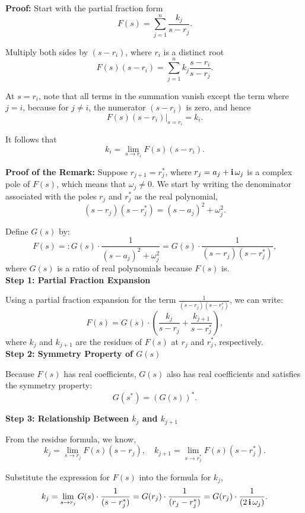 \textbf{Proof:}  Start with the partial fraction form
    \[
    F(s) = \sum_{j=1}^n \frac{k_j}{s - r_j}.
    \]

Multiply both sides by \((s - r_i)\), where \(r_i\) is a distinct root
    \[
    F(s) (s - r_i) = \sum_{j=1}^n k_j \frac{s - r_i}{s - r_j}.
    \]

 At \(s = r_i\), note that all terms in the summation vanish except the term where \(j = i\), because for \(j \neq i\), the numerator \((s - r_i)\) is zero, and hence
    \[
    F(s) (s - r_i) \Big|_{s = r_i} = k_i.
    \]

It follows that
    \[
    k_i = \lim_{s \to r_i} F(s) (s - r_i).
    \]
\Qed

\textbf{Proof of the Remark:} Suppose \(r_{j+1} = r_j^\ast\), where \(r_j = a_j + \mathop{\bm{\mathrm i}} \omega_j\) is a complex pole of \(F(s)\), which means that $\omega_j \neq 0$. We start by writing the denominator associated with the poles \(r_j\) and \(r_j^\ast\) as the real polynomial,
\[
(s - r_j)(s - r_j^\ast) = \left(s - a_j \right)^2 + \omega_j^2.
\]

Define \(G(s)\) by:
\[
F(s) =: G(s) \cdot \frac{1}{\left(s - a_j \right)^2 + \omega_j^2} = G(s) \cdot \frac{1}{(s - r_j)(s - r_j^\ast)},
\]
where \(G(s)\) is a ratio of real polynomials because \(F(s)\) is.\\

\textbf{Step 1: Partial Fraction Expansion}

Using a partial fraction expansion for the term \(\frac{1}{(s - r_j)(s - r_j^\ast)}\), we can write:
\[
F(s) = G(s) \cdot \left(\frac{k_j}{s - r_j} + \frac{k_{j+1}}{s - r_j^\ast}\right),
\]
where \(k_j\) and \(k_{j+1}\) are the residues of \(F(s)\) at \(r_j\) and \(r_j^\ast\), respectively.\\

\textbf{Step 2: Symmetry Property of \(G(s)\)}

Because \(F(s)\) has real coefficients, \(G(s)\) also has real coefficients and satisfies the symmetry property:
\[
G(s^\ast) = \left(G(s)\right)^\ast.
\]

\textbf{Step 3: Relationship Between \(k_j\) and \(k_{j+1}\)}

From the residue formula, we know,
\[
k_j = \lim_{s \to r_j} F(s)(s - r_j), \quad k_{j+1} = \lim_{s \to r_j^\ast} F(s)(s - r_j^\ast).
\]

Substitute the expression for \(F(s)\) into the formula for \(k_j\),
\[
k_j = \lim_{s \to r_j} G(s) \cdot \frac{1}{(s - r_j^\ast)} = G(r_j) \cdot \frac{1}{(r_j - r_j^\ast)} = G(r_j) \cdot \frac{1}{(2 \mathop{\bm{\mathrm i}} \omega_j)}.
\]

